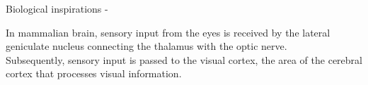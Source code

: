 %
%
%

\begin{frame}[t,allowframebreaks]{Biological inspirations - }

    In mammalian brain, 
    sensory input from the eyes 
    is received by the 
    \gls{lateral geniculate nucleus}
    connecting the thalamus with the optic nerve.\\
    \vspace{0.2cm}
    Subsequently, sensory input is passed to the \gls{visual cortex},
    the area of the \gls{cerebral cortex} that 
    processes visual information.\\


\end{frame}
